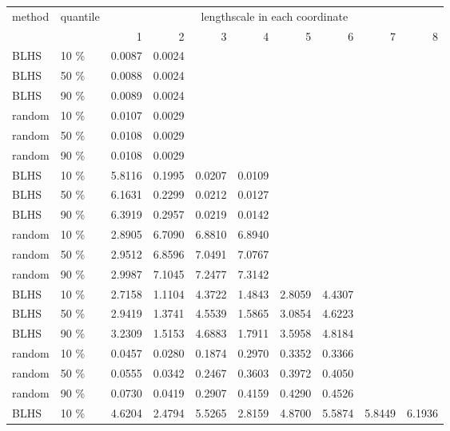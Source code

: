 \documentclass[12pt]{article}
\begin{document}
\begin{table}[ht!]
\small
 \centering
 \begin{tabular}{l l r r r r r r r r}
  \toprule
  \multirow{2}{*}{method} & 
  \multirow{2}{*}{quantile} & 
  \multicolumn{8}{c}{lengthscale in each coordinate}\\ \cmidrule(lr){3-10}
  && { 1} & { 2} & { 3} & { 4} & { 5} & { 6} & { 7} & { 8} \\ \cmidrule(lr){1-10} 
  BLHS & 10 \% & 0.0087 & 0.0024 &  &  &  &  &  &  \\ 
  BLHS & 50 \% & 0.0088 & 0.0024 &  &  &  &  &  &  \\ 
  BLHS & 90 \% & 0.0089 & 0.0024 &  &  &  &  &  &  \\ 
  \hline
  random & 10 \% & 0.0107 & 0.0029 &  &  &  &  &  &  \\ 
  random & 50 \% & 0.0108 & 0.0029 &  &  &  &  &  &  \\ 
  random & 90 \% & 0.0108 & 0.0029 &  &  &  &  &  &  \\ 
  \hline
  \hline
  BLHS & 10 \% & 5.8116 & 0.1995 & 0.0207 & 0.0109 &  &  &  &  \\ 
  BLHS & 50 \% & 6.1631 & 0.2299 & 0.0212 & 0.0127 &  &  &  &  \\ 
  BLHS & 90 \% & 6.3919 & 0.2957 & 0.0219 & 0.0142 &  &  &  &  \\ 
  \hline
  random & 10 \% & 2.8905 & 6.7090 & 6.8810 & 6.8940 &  &  &  &  \\ 
  random & 50 \% & 2.9512 & 6.8596 & 7.0491 & 7.0767 &  &  &  &  \\ 
  random & 90 \% & 2.9987 & 7.1045 & 7.2477 & 7.3142 &  &  &  &  \\ 
  \hline
  \hline
  BLHS & 10 \% & 2.7158 & 1.1104 & 4.3722 & 1.4843 & 2.8059 & 4.4307 &  &  \\ 
  BLHS & 50 \% & 2.9419 & 1.3741 & 4.5539 & 1.5865 & 3.0854 & 4.6223 &  &  \\ 
  BLHS & 90 \% & 3.2309 & 1.5153 & 4.6883 & 1.7911 & 3.5958 & 4.8184 &  &  \\ 
  \hline
  random & 10 \% & 0.0457 & 0.0280 & 0.1874 & 0.2970 & 0.3352 & 0.3366 &  &  \\ 
  random & 50 \% & 0.0555 & 0.0342 & 0.2467 & 0.3603 & 0.3972 & 0.4050 &  &  \\ 
  random & 90 \% & 0.0730 & 0.0419 & 0.2907 & 0.4159 & 0.4290 & 0.4526 &  &  \\ 
  \hline
  \hline
  BLHS & 10 \% & 4.6204 & 2.4794 & 5.5265 & 2.8159 & 4.8700 & 5.5874 & 5.8449 & 6.1936 \\ 

\end{tabular}
\end{table}
\end{document}
